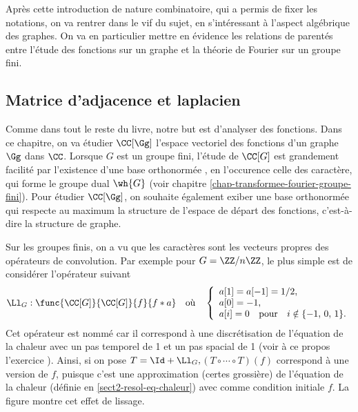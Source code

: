 Après cette introduction de nature combinatoire, qui a permis de fixer les notations, on va rentrer dans le vif du sujet, en s'intéressant à l'aspect algébrique des graphes. On va en particulier mettre en évidence les relations de parentés entre l'étude des fonctions sur un graphe et la théorie de Fourier sur un groupe fini.
\subsection{Matrice d'adjacence et laplacien}
\label{sect2-matrice-adjacence-laplacien} 


Comme dans tout le reste du livre, notre but est d'analyser des fonctions. Dans ce chapitre, on va étudier $\CC[\Gg]$ l'espace vectoriel des fonctions d'un graphe $\Gg$ dans $\CC$. Lorsque $G$ est un groupe fini, l'étude de $\CC[G]$ est grandement facilité par l'existence d'une base orthonormée , en l'occurence celle des caractère, qui forme le groupe dual $\wh{G}$ (voir chapitre \ref{chap-transformee-fourier-groupe-fini}). Pour étudier $\CC[\Gg]$, on souhaite également exiber une base orthonormée qui respecte au maximum la structure de l'espace de départ des fonctions, c'est-à-dire la structure de graphe.

\paraspace
Sur les groupes finis, on a vu que les caractères sont les vecteurs propres des opérateurs de convolution. Par exemple pour $G = \ZZ/n\ZZ$, le plus simple est de considérer l'opérateur suivant
\begin{equation*}
\Ll_G : \func{ \CC[G] }{ \CC[G] } { f }{ f * a } \quad \text{où} \quad \left\{ \begin{array}{l} a[1] = a[-1] = 1/2, \\ a[0] = -1, \\ a[i] = 0 \quad \text{pour} \quad i \notin \{-1,\,0,\,1\}. \end{array} \right.
\end{equation*}
Cet opérateur est nommé  car il correspond à une discrétisation de l'équation de la chaleur avec un pas temporel de 1 et un pas spacial de 1 (voir à ce propos l'exercice ). Ainsi, si on pose $T = \Id+\Ll_G, $$(T \circ \cdots \circ T)(f)$ correspond à une version  de $f$, puisque c'est une approximation (certes grossière) de l'équation de la chaleur (définie en \ref{sect2-resol-eq-chaleur}) avec comme condition initiale $f$. La figure \figref{} montre cet effet de lissage.

